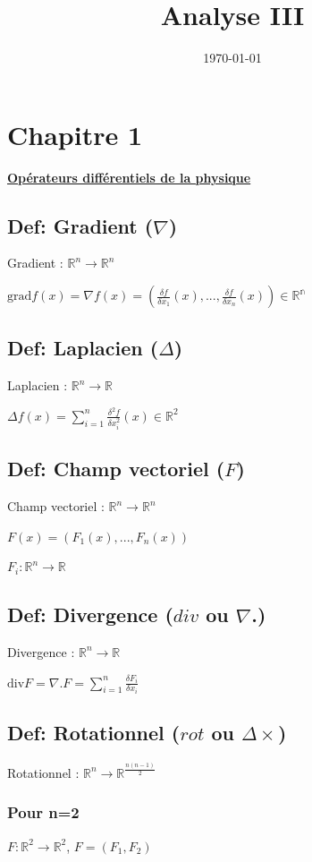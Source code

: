 \documentclass[11pt]{article}
\date{\today}
\title{Analyse III}
\begin{document}
\maketitle
\tableofcontents


\section{Chapitre 1}
\label{sec:orgheadline9}
\uline{\textbf{Opérateurs différentiels de la physique}}
\subsection{Def: Gradient (\(\nabla\))}
\label{sec:orgheadline1}
Gradient : \(\mathbb{R}^n \rightarrow \mathbb{R}^n\)

\(\text{grad} f(x) = \nabla f(x) = \left(\frac{\delta f}{\delta x_1}
(x),...,\frac{\delta f}{\delta x_n} (x)\right) \in \mathbb{R^n}\)
\subsection{Def: Laplacien (\(\Delta\))}
\label{sec:orgheadline2}
Laplacien : \(\mathbb{R}^n \rightarrow \mathbb{R}\)

\(\Delta f(x) = \sum\limits_{i=1}^n \frac{\delta^2 f}{\delta x_i^2} (x) \in \mathbb{R}^2\)
\subsection{Def: Champ vectoriel (\(F\))}
\label{sec:orgheadline3}
Champ vectoriel : \(\mathbb{R}^n \rightarrow \mathbb{R}^n\)

\(F(x) = \left(F_1(x),...,F_n(x)\right)\)

\(F_i: \mathbb{R}^n \rightarrow \mathbb{R}\)
\subsection{Def: Divergence (\(div\) ou \(\nabla\).)}
\label{sec:orgheadline4}
Divergence : \(\mathbb{R}^n \rightarrow \mathbb{R}\)


\(\text{div} F = \nabla . F = \sum\limits_{i=1}^n \frac{\delta F_i}{\delta x_i}\)
\subsection{Def: Rotationnel (\(rot\) ou  \(\Delta \times\))}
\label{sec:orgheadline7}
Rotationnel : \(\mathbb{R}^n \rightarrow \mathbb{R}^{\frac{n(n-1)}{2}}\)
\subsubsection{Pour n=2}
\label{sec:orgheadline5}
\(F: \mathbb{R}^2 \rightarrow \mathbb{R}^2\), \(F=(F_1,F_2)\)
\end{document}
